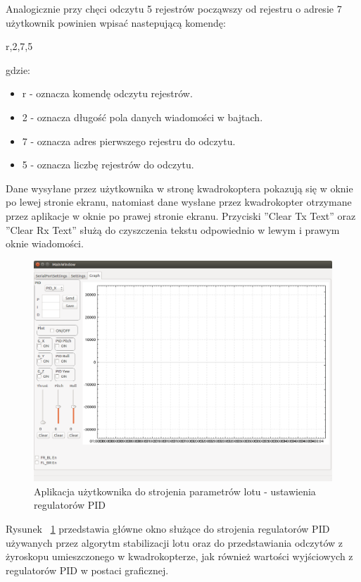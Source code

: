 Analogicznie przy chęci odczytu 5 rejestrów począwszy od rejestru o adresie 7 użytkownik powinien wpisać nastepującą komendę:

r,2,7,5

gdzie:
\begin{itemize}
	\item r - oznacza komendę odczytu rejestrów.
	\item 2 - oznacza długość pola danych wiadomości w bajtach.
	\item 7 - oznacza adres pierwszego rejestru do odczytu.
	\item 5 - oznacza liczbę rejestrów do odczytu.
\end{itemize}
Dane wysyłane przez użytkownika w stronę kwadrokoptera pokazują się w oknie po lewej stronie ekranu, natomiast dane wysłane przez kwadrokopter  otrzymane przez aplikacje w oknie po prawej stronie ekranu. Przyciski ''Clear Tx Text'' oraz ''Clear Rx Text'' służą do czyszczenia tekstu odpowiednio w lewym i prawym oknie wiadomości. 

\begin{figure}[H]
	\centering
	\includegraphics[scale=0.4]{Pictures/QuadroTune/QuadroTuneGraph.png}
	\caption[Aplikacja użytkownika do strojenia parametrów lotu - ustawienia regulatorów PID]{Aplikacja użytkownika do strojenia parametrów lotu - ustawienia regulatorów PID}
	\label{fig:QuadroTune_screen3}
\end{figure}

Rysunek ~\ref{fig:QuadroTune_screen3} przedstawia główne okno służące do strojenia regulatorów PID używanych przez algorytm stabilizacji lotu oraz do przedstawiania odczytów z żyroskopu umieszczonego w kwadrokopterze, jak również wartości wyjściowych z regulatorów PID w postaci graficznej.

